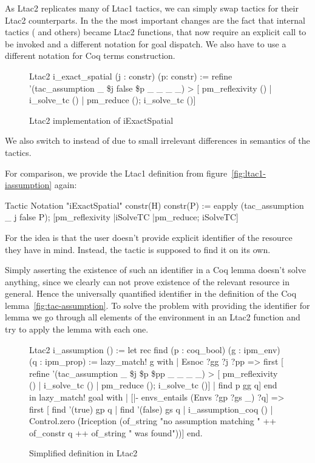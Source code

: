 As Ltac2 replicates many of Ltac1 tactics, we can simply swap tactics for their Ltac2 counterparts.
In the  the most important changes are the fact that internal tactics ( and others) became Ltac2 functions, that now require an explicit call to be invoked and a different notation for goal dispatch.
We also have to use a different notation for Coq terms construction.
\begin{figure}[H]
\begin{coq}
Ltac2 i_exact_spatial (j : constr) (p: constr) :=
  refine '(tac_assumption _ \$j false \$p _ _ _ _) >
           [ pm_reflexivity ()
           | i_solve_tc ()
           | pm_reduce (); i_solve_tc ()]
\end{coq}
  \caption{Ltac2 implementation of iExactSpatial}
  \label{fig:iexact-ltac2}
\end{figure}
We also switch to  instead of  due to small irrelevant differences in semantics of the tactics.

For comparison, we provide the Ltac1 definition from figure~\ref{fig:ltac1-iassumption} again:
\begin{coq}
Tactic Notation "iExactSpatial" constr(H) constr(P) :=
  eapply (tac_assumption _ j false P);
    [pm_reflexivity
    |iSolveTC
    |pm_reduce; iSolveTC]
\end{coq}

For  the idea is that the user doesn't provide explicit identifier of the resource they have in mind.
Instead, the tactic is supposed to find it on its own.

Simply asserting the existence of such an identifier in a Coq lemma doesn't solve anything, since we clearly can not prove existence of the relevant resource in general.
Hence the universally quantified identifier in the definition of the Coq lemma~\ref{fig:tac-assumption}.
To solve the problem with providing the identifier for lemma we go through all elements of the environment in an Ltac2 function and try to apply the lemma with each one.

\begin{figure}
\begin{coq}
Ltac2 i_assumption () :=
  let rec find (p : coq_bool) (g : ipm_env) (q : ipm_prop) :=
      lazy_match! g with
      | Esnoc ?gg ?j ?pp =>
        first [ refine '(tac_assumption _ \$j \$p \$pp _ _ _ _) >
                [ pm_reflexivity ()
                | i_solve_tc ()
                | pm_reduce (); i_solve_tc ()]
              | find p gg q]
      end
  in
  lazy_match! goal with
  | [|- envs_entails (Envs ?gp ?gs _) ?q] =>
     first [ find '(true) gp q
           | find '(false) gs q
           | i_assumption_coq ()
           | Control.zero (Iriception (of_string "no assumption matching " ++
                                       of_constr q ++
                                       of_string " was found"))]
  end.
\end{coq}
\caption{Simplified  definition in Ltac2}
\label{fig:i-assumption-def}
\end{figure}



